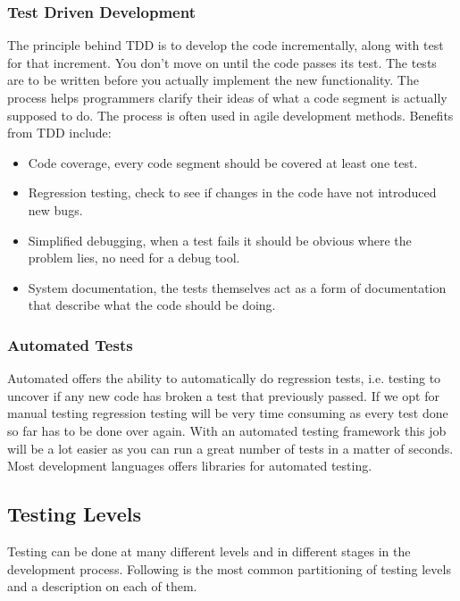 \subsubsection{Test Driven Development}
The principle behind TDD is to develop the code incrementally, along with test for that increment. You don’t move on until the code passes its test. The tests are to be written before you actually implement the new functionality. The process helps programmers clarify their ideas of what a code segment is actually supposed to do. The process is often used in agile development methods.
Benefits from TDD include:
\begin{itemize}

\item Code coverage, every code segment should be covered at least one test.

\item Regression testing, check to see if changes in the code have not introduced new bugs.

\item Simplified debugging, when a test fails it should be obvious where the problem lies, no need for a debug tool.

\item System documentation, the tests themselves act as a form of documentation that describe what the code should be doing.

\end{itemize}

\cite{beck2003test-driven}

\subsubsection{Automated Tests}
Automated offers the ability to automatically do regression tests, i.e. testing to uncover if any new code has broken a test that previously passed. If we opt for manual testing regression testing will be very time consuming as every test done so far has to be done over again. With an automated testing framework this job will be a lot easier as you can run a great number of tests in a matter of seconds. Most development languages offers libraries for automated testing.


\subsection{Testing Levels}
Testing can be done at many different levels and in different stages in the development process. Following is the most common partitioning of testing levels and a description on each of them.

